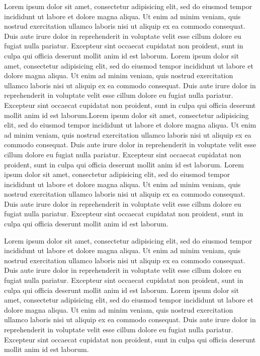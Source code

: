\documentclass{chi-ext}
\begin{document}
Lorem ipsum dolor sit amet, consectetur adipisicing elit, sed do eiusmod tempor incididunt ut labore et dolore magna aliqua. Ut enim ad minim veniam, quis nostrud exercitation ullamco laboris nisi ut aliquip ex ea commodo consequat. Duis aute irure dolor in reprehenderit in voluptate velit esse cillum dolore eu fugiat nulla pariatur. Excepteur sint occaecat cupidatat non proident, sunt in culpa qui officia deserunt mollit anim id est laborum. Lorem ipsum dolor sit amet, consectetur adipisicing elit, sed do eiusmod tempor incididunt ut labore et dolore magna aliqua. Ut enim ad minim veniam, quis nostrud exercitation ullamco laboris nisi ut aliquip ex ea commodo consequat. Duis aute irure dolor in reprehenderit in voluptate velit esse cillum dolore eu fugiat nulla pariatur. Excepteur sint occaecat cupidatat non proident, sunt in culpa qui officia deserunt mollit anim id est laborum.Lorem ipsum dolor sit amet, consectetur adipisicing elit, sed do eiusmod tempor incididunt ut labore et dolore magna aliqua. Ut enim ad minim veniam, quis nostrud exercitation ullamco laboris nisi ut aliquip ex ea commodo consequat. Duis aute irure dolor in reprehenderit in voluptate velit esse cillum dolore eu fugiat nulla pariatur. Excepteur sint occaecat cupidatat non proident, sunt in culpa qui officia deserunt mollit anim id est laborum. Lorem ipsum dolor sit amet, consectetur adipisicing elit, sed do eiusmod tempor incididunt ut labore et dolore magna aliqua. Ut enim ad minim veniam, quis nostrud exercitation ullamco laboris nisi ut aliquip ex ea commodo consequat. Duis aute irure dolor in reprehenderit in voluptate velit esse cillum dolore eu fugiat nulla pariatur. Excepteur sint occaecat cupidatat non proident, sunt in culpa qui officia deserunt mollit anim id est laborum.

Lorem ipsum dolor sit amet, consectetur adipisicing elit, sed do eiusmod tempor incididunt ut labore et dolore magna aliqua. Ut enim ad minim veniam, quis nostrud exercitation ullamco laboris nisi ut aliquip ex ea commodo consequat. Duis aute irure dolor in reprehenderit in voluptate velit esse cillum dolore eu fugiat nulla pariatur. Excepteur sint occaecat cupidatat non proident, sunt in culpa qui officia deserunt mollit anim id est laborum. Lorem ipsum dolor sit amet, consectetur adipisicing elit, sed do eiusmod tempor incididunt ut labore et dolore magna aliqua. Ut enim ad minim veniam, quis nostrud exercitation ullamco laboris nisi ut aliquip ex ea commodo consequat. Duis aute irure dolor in reprehenderit in voluptate velit esse cillum dolore eu fugiat nulla pariatur. Excepteur sint occaecat cupidatat non proident, sunt in culpa qui officia deserunt mollit anim id est laborum.
\end{document}

